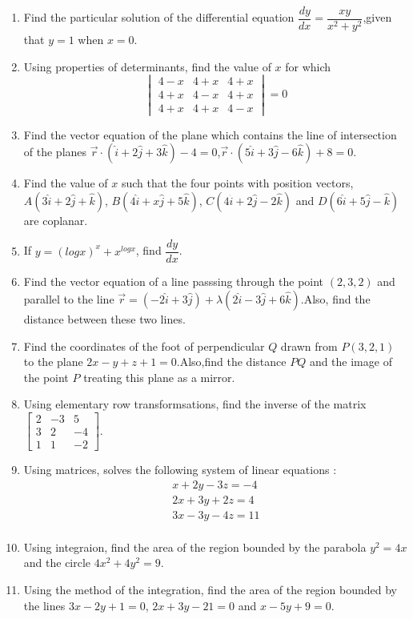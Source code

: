 \documentclass[12pt,-letter paper]{article}
\providecommand{\myvec}[1]{\ensuremath{\begin{bmatrix}#1\end{bmatrix}}}
\providecommand{\brak}[1]{\ensuremath{\left(#1\right)}}
\begin{document}
{\begin{enumerate}
\item Find the particular solution of the differential equation $\dfrac{dy}{dx}=\dfrac{xy}{x^{2}+y^{2}}$,given that $y=1$ when $x=0$.
\item Using properties of determinants, find the value of $x$ for which
	\[\begin{vmatrix}
		4-x & 4+x & 4+x\\
		4+x & 4-x & 4+x\\
		4+x & 4+x & 4-x
	\end{vmatrix}=0\]
\item Find the vector equation of the plane which contains the line of intersection of the planes $\overrightarrow{r}\cdot(\hat{i}+2\hat{j}+3\hat{k})-4=0$,$\overrightarrow{r}\cdot(5\hat{i}+3\hat{j}-6\hat{k})+8=0$.
\item Find the value of $x$ such that the four points with position vectors,
	$A\brak{3\hat{i}+2\hat{j}+\hat{k}}$,
	$B\brak{4\hat{i}+x\hat{j}+5\hat{k}}$,
	$C\brak{4\hat{i}+2\hat{j}-2\hat{k}}$ and 
	$D\brak{6\hat{i}+5\hat{j}-\hat{k}}$ are coplanar.
\item If $y=(logx)^{x} + x^{logx}$, find $\dfrac{dy}{dx}$.
\item Find the vector equation of a line passsing through the point $\brak{2,3,2}$ and parallel to the line $\overrightarrow{r} =\brak{-2\hat{i}+3\hat{j}}+\lambda{\brak{2\hat{i}-3\hat{j}+6\hat{k}}}$.Also, find the distance between these two lines.
\item Find the coordinates of the foot of perpendicular $Q$ drawn from $P\brak{3,2,1}$ to the plane $2x-y+z+1=0$.Also,find the distance $PQ$ and the image of the point $P$ treating this plane as a mirror.
\item Using elementary row transformsations, find the inverse of the matrix $\myvec{2 & -3 & 5 \\3 & 2 & -4 \\1 & 1 & -2}$.
\item Using matrices, solves the following system of linear equations :
	\begin{align*}
		{x+2y-3z}=-4\\
		{2x+3y+2z}=4\\
		{3x-3y-4z}=11\\
	\end{align*}
\item Using integraion, find the area of the region bounded by the parabola $y^{2}=4x$ and the circle $4x^{2}+4y^{2}=9$.
\item Using the method of the integration, find the area of the region bounded by the lines $3x-2y+1=0$, $2x+3y-21=0$ and $x-5y+9=0$.

\end{enumerate}}
\end{document}
